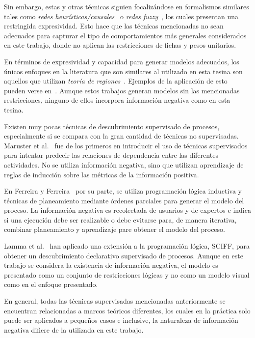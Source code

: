 Sin embargo, estas y otras técnicas siguien focalizándose en formalismos similares tales como
\emph{redes heurísticas/causales}~\cite{WeijtersR11} o \emph{redes fuzzy}~\cite{AalstG07}, los cuales presentan
una restringida expresividad.
Esto hace que las técnicas mencionadas no sean adecuados para capturar el tipo de comportamientos más generales
considerados en este trabajo, donde no aplican las restricciones de fichas y pesos unitarios.

En términos de expresividad y capacidad para generar modelos adecuados, los únicos enfoques en la literatura 
que son similares al utilizado en esta tesina son aquellos que utilizan \textit{teoría de regiones}~\cite{ehrenfeucht90, ehrenfeucht90a}.
Ejemplos de la aplicación de esto pueden verse en~\cite{Bergenthum07, van2008process, CarmonaCK10, SoleC11}.
Aunque estos trabajos generan modelos sin las mencionadas restricciones, ninguno de ellos incorpora
información negativa como en esta tesina.

Existen muy pocas técnicas de descubrimiento supervisado de procesos, especialmente si se compara
con la gran cantidad de técnicas no supervisadas. Maruster et al.~\cite{Maruster2006} fue de los 
primeros en introducir el uso de técnicas supervisados para intentar predecir las relaciones
de dependencia entre las diferentes actividades. No se utiliza información negativa, sino que
utilizan aprendizaje de reglas de inducción sobre las métricas de la información positiva.

En Ferreira y Ferreira~\cite{Ferreira2006} por su parte, se utiliza programación lógica inductiva
y técnicas de planeamiento mediante órdenes parciales para generar el modelo del proceso.
La información negativa es recolectada de usuarios y de expertos e indica si una
ejecución debe ser realizable o debe evitarse para, de manera iterativa, combinar
planeamiento y aprendizaje pare obtener el modelo del proceso.

Lamma et al.~\cite{Lamma2007,Lamma2008,alberti2008verifiable} han aplicado una extensión a la 
programación lógica, SCIFF, para obtener un descubrimiento declarativo supervisado de procesos.
Aunque en este trabajo se considera la existencia de información negativa, el modelo es presentado 
como un conjunto de restricciones lógicas y no como un modelo visual como en el enfoque presentado. 

En general, todas las técnicas supervisadas mencionadas anteriormente se encuentran relacionadas a 
marcos teóricos diferentes, los cuales en la práctica solo puede ser aplicados a pequeños casos e 
inclusive, la naturaleza de información negativa difiere de la utilizada en este trabajo.

